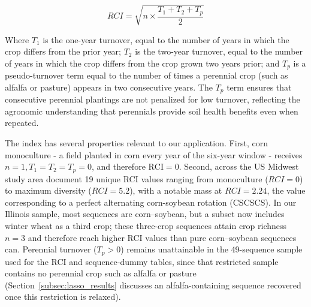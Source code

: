 \documentclass[12pt,letterpaper]{article}
\theoremstyle{remark}
\theoremstyle{remark}
\theoremstyle{plain}
\theoremstyle{definition}
\begin{document}
\begin{equation}
    RCI = \sqrt{n\times \dfrac{T_{1}+T_{2}+T_{p}}{2}}\label{eq:rci}
\end{equation}

Where $T_{1}$ is the one-year turnover, equal to the number of years in which the crop differs from the prior year; $T_{2}$ is the two-year turnover, equal to the number of years in which the crop differs from the crop grown two years prior; and $T_{p}$ is a pseudo-turnover term equal to the number of times a perennial crop (such as alfalfa or pasture) appears in two consecutive years. The $T_{p}$ term ensures that consecutive perennial plantings are not penalized for low turnover, reflecting the agronomic understanding that perennials provide soil health benefits even when repeated. 

The index has several properties relevant to our application. First, corn monoculture - a field planted in corn every year of the six-year window - receives $n=1, T_{1}=T_{2}=T_{p}=0$, and therefore $\text{RCI} = 0$. Second, across the US Midwest study area \citet{socolar2021} document 19 unique RCI values ranging from monoculture ($RCI = 0$) to maximum diversity ($RCI = 5.2$), with a notable mass at $RCI = 2.24$, the value corresponding to a perfect alternating corn-soybean rotation (CSCSCS). In our Illinois sample, most sequences are corn--soybean, but a subset now includes winter wheat as a third crop; these three-crop sequences attain crop richness $n = 3$ and therefore reach higher RCI values than pure corn--soybean sequences can. Perennial turnover ($T_{p} > 0$) remains unattainable in the 49-sequence sample used for the RCI and sequence-dummy tables, since that restricted sample contains no perennial crop such as alfalfa or pasture (Section~\ref{subsec:lasso_results} discusses an alfalfa-containing sequence recovered once this restriction is relaxed). %
\end{document}
